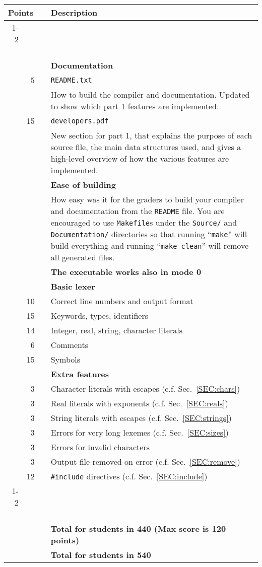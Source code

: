 \documentclass{article}
\makeatletter
\newcommand{\gradeline}{ \cline{1-2} \cline{4-4} ~\\[-1.5ex] }
\newenvironment{gradetable}{\begin{longtable}{@{}rrcp{5in}} \multicolumn{2}{l}{\bf Points} & & {\bf Description}\\ \gradeline}{\end{longtable}}
\newcommand{\mainitem}[2]{\pagebreak[2] {\bf #1} &&& {\bf #2}}
\newcommand{\mainpara}[1]{~ &&& {#1} }
\newcommand{\inneritem}[2]{~ & #1 && #2}
\newcommand{\innerpara}[1]{~ & ~ && #1}
\makeatother
\begin{document}
\noindent
\begin{gradetable}
  \mainitem{20}{Documentation}
  \\[1mm]
  \inneritem{5}{\tt README.txt}
  \\[1mm]
  \innerpara{%
    How to build the compiler and documentation.
    Updated to show which part 1 features are implemented.
  }
  \\[1mm]
  \inneritem{15}{\tt developers.pdf}
  \\[1mm]
  \innerpara{%
    New section for part 1, that explains
    the purpose of each source file,
    the main data structures used,
    and gives a high-level overview of how the various
    features are implemented.
  }
  \\[4mm]

  \mainitem{10}{Ease of building}
  \\[1mm]
  \mainpara{%
    How easy was it for the graders to build your compiler and
    documentation from the {\tt README} file.
		You are encouraged to use {\tt Makefile}s under the
		{\tt Source/} and {\tt Documentation/}
		directories so that running ``{\tt make}''
		will build everything and running ``{\tt make clean}''
		will remove all generated files.
  }
  \\[4mm]

  \mainitem{5}{The executable works also in mode 0}
  \\[4mm]

  \mainitem{60}{Basic lexer}
  \\
  \inneritem{10}{Correct line numbers and output format}
  \\
	\inneritem{15}{Keywords, types, identifiers}
  \\
  \inneritem{14}{Integer, real, string, character literals}
  \\
  \inneritem{6}{Comments}
  \\
  \inneritem{15}{Symbols}
  \\[4mm]

  \mainitem{30}{Extra features}
	\\
  \inneritem{3}{Character literals with escapes (c.f. Sec.~\ref{SEC:chars})}
	\\
  \inneritem{3}{Real literals with exponents (c.f. Sec.~\ref{SEC:reals})}
	\\
  \inneritem{3}{String literals with escapes (c.f. Sec.~\ref{SEC:strings})}
	\\
  \inneritem{3}{Errors for very long lexemes (c.f. Sec.~\ref{SEC:sizes})}
	\\
  \inneritem{3}{Errors for invalid characters}
  \\
  \inneritem{3}{Output file removed on error (c.f. Sec.~\ref{SEC:remove})}
  \\
  \inneritem{12}{{\tt \#include} directives (c.f. Sec.~\ref{SEC:include})}
  \\

  \gradeline
  \mainitem{100}{Total for students in 440 (Max score is 120 points)}
  \\
  \mainitem{110}{Total for students in 540}
\end{gradetable}
\end{document}

